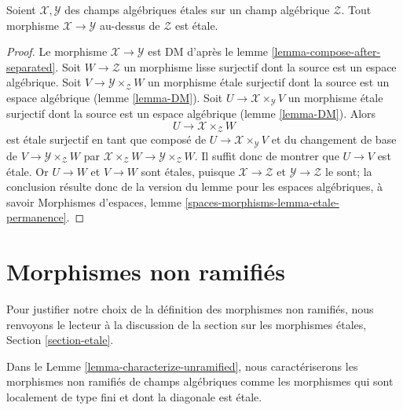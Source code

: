 \begin{lemma}
\label{lemma-etale-permanence}
Soient $\mathcal{X}, \mathcal{Y}$ des champs alg\'ebriques \'etales sur
un champ alg\'ebrique $\mathcal{Z}$. Tout morphisme
$\mathcal{X} \to \mathcal{Y}$ au-dessus de $\mathcal{Z}$ est \'etale.
\end{lemma}

\begin{proof}
Le morphisme $\mathcal{X} \to \mathcal{Y}$ est DM d'apr\`es
le lemme \ref{lemma-compose-after-separated}.
Soit $W \to \mathcal{Z}$ un morphisme lisse surjectif
dont la source est un espace alg\'ebrique. Soit
$V \to \mathcal{Y} \times_\mathcal{Z} W$ un morphisme \'etale surjectif
dont la source est un espace alg\'ebrique
(lemme \ref{lemma-DM}).
Soit $U \to \mathcal{X} \times_\mathcal{Y} V$ un morphisme \'etale surjectif
dont la source est un espace alg\'ebrique
(lemme \ref{lemma-DM}).
Alors
$$
U \longrightarrow \mathcal{X} \times_\mathcal{Z} W
$$
est \'etale surjectif en tant que compos\'e de
$U \to \mathcal{X} \times_\mathcal{Y} V$
et du changement de base de $V \to \mathcal{Y} \times_\mathcal{Z} W$
par $\mathcal{X} \times_\mathcal{Z} W \to \mathcal{Y} \times_\mathcal{Z} W$.
Il suffit donc de montrer que $U \to V$ est \'etale.
Or $U \to W$ et $V \to W$ sont \'etales, puisque
$\mathcal{X} \to \mathcal{Z}$ et $\mathcal{Y} \to \mathcal{Z}$
le sont; la conclusion r\'esulte donc de la version du lemme pour les
espaces alg\'ebriques, \`a savoir
Morphismes d'espaces, lemme \ref{spaces-morphisms-lemma-etale-permanence}.
\end{proof}








\section{Morphismes non ramifi\'es}
\label{section-unramified}

\noindent
Pour justifier notre choix de la d\'efinition des morphismes
non ramifi\'es, nous renvoyons le lecteur \`a la discussion
de la section sur les morphismes \'etales, Section \ref{section-etale}.

\medskip\noindent
Dans le Lemme \ref{lemma-characterize-unramified}, nous caract\'eriserons
les morphismes non ramifi\'es de champs alg\'ebriques comme les morphismes
qui sont localement de type fini et dont la diagonale est \'etale.

